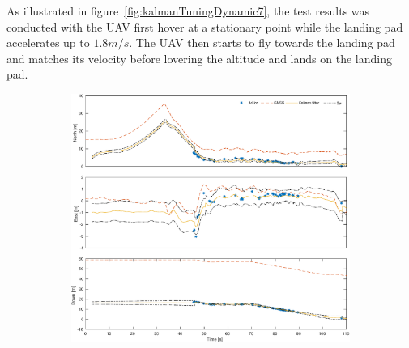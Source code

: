 As illustrated in figure~\ref{fig:kalmanTuningDynamic7}, the test results was conducted with the \gls{UAV} first hover at a stationary point while the landing pad accelerates up to $1.8m/s$. The \gls{UAV} then starts to fly towards the landing pad and matches its velocity before lovering the altitude and lands on the landing pad.
\begin{figure}
	\centering
	\begin{subfigure}{.75\textwidth}
		\includegraphics[width=\textwidth]{img/plot/dynamic/dynamic_7_pos.eps}
		\label{fig:kalmanTuningDynamic7Pos}
	\end{subfigure}


\end{figure}
